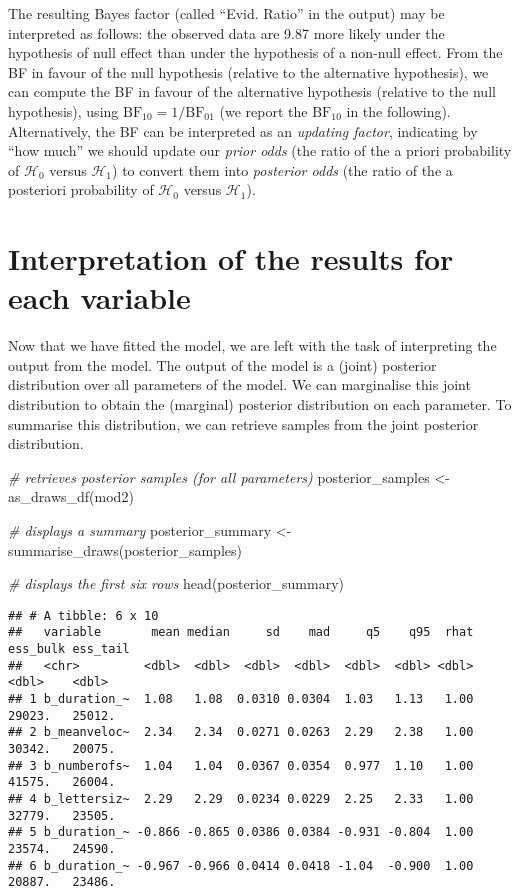 \documentclass[
  11pt,
  english,
  ,doc,floatsintext]{apa6}
\newenvironment{Shaded}{}{}
\newcommand{\CommentTok}[1]{\textcolor[rgb]{0.38,0.63,0.69}{\textit{#1}}}
\newcommand{\FunctionTok}[1]{\textcolor[rgb]{0.02,0.16,0.49}{#1}}
\newcommand{\NormalTok}[1]{#1}
\newcommand{\OtherTok}[1]{\textcolor[rgb]{0.00,0.44,0.13}{#1}}
\begin{document}
The resulting Bayes factor (called ``Evid. Ratio'' in the output) may be interpreted as follows: the observed data are 9.87 more likely under the hypothesis of null effect than under the hypothesis of a non-null effect. From the BF in favour of the null hypothesis (relative to the alternative hypothesis), we can compute the BF in favour of the alternative hypothesis (relative to the null hypothesis), using \(\text{BF}_{10} = 1 / \text{BF}_{01}\) (we report the \(\text{BF}_{10}\) in the following). Alternatively, the BF can be interpreted as an \emph{updating factor}, indicating by ``how much'' we should update our \emph{prior odds} (the ratio of the a priori probability of \(\mathcal{H}_{0}\) versus \(\mathcal{H}_{1}\)) to convert them into \emph{posterior odds} (the ratio of the a posteriori probability of \(\mathcal{H}_{0}\) versus \(\mathcal{H}_{1}\)).

\newpage

\hypertarget{interpretation-of-the-results-for-each-variable}{%
\section{Interpretation of the results for each variable}\label{interpretation-of-the-results-for-each-variable}}

Now that we have fitted the model, we are left with the task of interpreting the output from the model. The output of the model is a (joint) posterior distribution over all parameters of the model. We can marginalise this joint distribution to obtain the (marginal) posterior distribution on each parameter. To summarise this distribution, we can retrieve samples from the joint posterior distribution.

\begin{Shaded}
\begin{Highlighting}[]
\CommentTok{\# retrieves posterior samples (for all parameters)}
\NormalTok{posterior\_samples }\OtherTok{\textless{}{-}} \FunctionTok{as\_draws\_df}\NormalTok{(mod2)}

\CommentTok{\# displays a summary}
\NormalTok{posterior\_summary }\OtherTok{\textless{}{-}} \FunctionTok{summarise\_draws}\NormalTok{(posterior\_samples)}

\CommentTok{\# displays the first six rows}
\FunctionTok{head}\NormalTok{(posterior\_summary)}
\end{Highlighting}
\end{Shaded}

\begin{verbatim}
## # A tibble: 6 x 10
##   variable       mean median     sd    mad     q5    q95  rhat ess_bulk ess_tail
##   <chr>         <dbl>  <dbl>  <dbl>  <dbl>  <dbl>  <dbl> <dbl>    <dbl>    <dbl>
## 1 b_duration_~  1.08   1.08  0.0310 0.0304  1.03   1.13   1.00   29023.   25012.
## 2 b_meanveloc~  2.34   2.34  0.0271 0.0263  2.29   2.38   1.00   30342.   20075.
## 3 b_numberofs~  1.04   1.04  0.0367 0.0354  0.977  1.10   1.00   41575.   26004.
## 4 b_lettersiz~  2.29   2.29  0.0234 0.0229  2.25   2.33   1.00   32779.   23505.
## 5 b_duration_~ -0.866 -0.865 0.0386 0.0384 -0.931 -0.804  1.00   23574.   24590.
## 6 b_duration_~ -0.967 -0.966 0.0414 0.0418 -1.04  -0.900  1.00   20887.   23486.
\end{verbatim}
\end{document}
